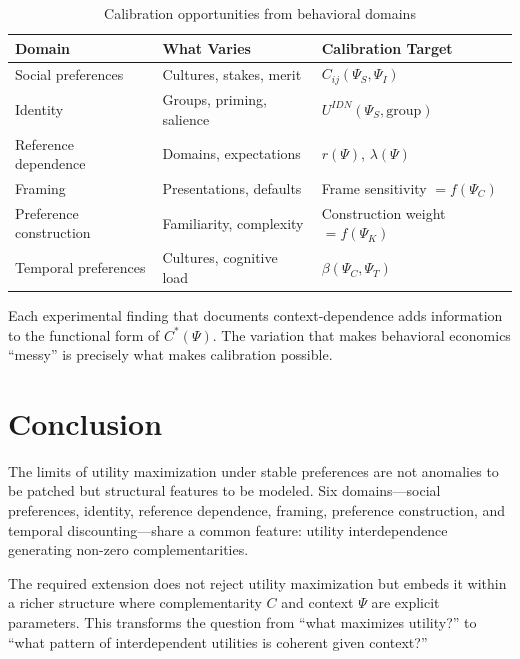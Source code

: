 \documentclass[12pt]{article}
\begin{document}
\begin{table}[h]
\centering
\small
\begin{tabular}{lll}
\toprule
\textbf{Domain} & \textbf{What Varies} & \textbf{Calibration Target} \\
\midrule
Social preferences & Cultures, stakes, merit & $C_{ij}(\Psi_S, \Psi_I)$ \\
Identity & Groups, priming, salience & $U^{IDN}(\Psi_S, \text{group})$ \\
Reference dependence & Domains, expectations & $r(\Psi)$, $\lambda(\Psi)$ \\
Framing & Presentations, defaults & Frame sensitivity $= f(\Psi_C)$ \\
Preference construction & Familiarity, complexity & Construction weight $= f(\Psi_K)$ \\
Temporal preferences & Cultures, cognitive load & $\beta(\Psi_C, \Psi_T)$ \\
\bottomrule
\end{tabular}
\caption{Calibration opportunities from behavioral domains}
\label{tab:calibration}
\end{table}

Each experimental finding that documents context-dependence adds information to the functional form of $C^*(\Psi)$. The variation that makes behavioral economics ``messy'' is precisely what makes calibration possible.



\section{Conclusion}
\label{sec:conclusion}

The limits of utility maximization under stable preferences are not anomalies to be patched but structural features to be modeled. Six domains---social preferences, identity, reference dependence, framing, preference construction, and temporal discounting---share a common feature: utility interdependence generating non-zero complementarities.

The required extension does not reject utility maximization but embeds it within a richer structure where complementarity $C$ and context $\Psi$ are explicit parameters. This transforms the question from ``what maximizes utility?'' to ``what pattern of interdependent utilities is coherent given context?''
\end{document}
